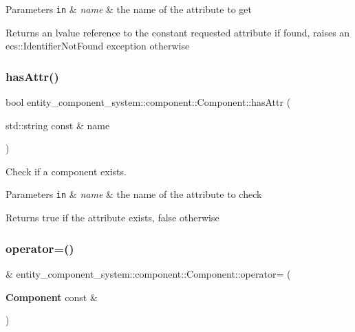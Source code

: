 \begin{DoxyParams}[1]{Parameters}
\mbox{\tt in}  & {\em name} & the name of the attribute to get \\
\hline
\end{DoxyParams}
\begin{DoxyReturn}{Returns}
an lvalue reference to the constant requested attribute if found, raises an ecs\+::\+Identifier\+Not\+Found exception otherwise 
\end{DoxyReturn}
\label{classentity__component__system_1_1component_1_1_component_a246064b921fa448efd22b56b865e4c64} 
\subsubsection{has\+Attr()}
{\footnotesize\ttfamily bool entity\+\_\+component\+\_\+system\+::component\+::\+Component\+::has\+Attr (\begin{DoxyParamCaption}\item[{std\+::string const \&}]{name }\end{DoxyParamCaption})\hspace{0.3cm}{\ttfamily [inline]}}



Check if a component exists. 


\begin{DoxyParams}[1]{Parameters}
\mbox{\tt in}  & {\em name} & the name of the attribute to check \\
\hline
\end{DoxyParams}
\begin{DoxyReturn}{Returns}
true if the attribute exists, false otherwise 
\end{DoxyReturn}
\label{classentity__component__system_1_1component_1_1_component_a0ddd19ec0026ac151bfb75c4698f09aa} 
\subsubsection{operator=()\hspace{0.1cm}{\footnotesize\ttfamily [1/2]}}
{\footnotesize{}\& entity\+\_\+component\+\_\+system\+::component\+::\+Component\+::operator= (\begin{DoxyParamCaption}\item[{{\bf Component} const \&}]{ }\end{DoxyParamCaption})\hspace{0.3cm}{\ttfamily [default]}}



